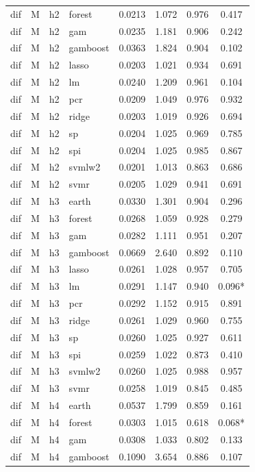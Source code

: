 \begin{ThreePartTable}
\begin{longtable}[t]{llclcccc}
dif & M & h2 & forest & 0.0213 & 1.072 & 0.976 & 0.417\\
dif & M & h2 & gam & 0.0235 & 1.181 & 0.906 & 0.242\\
dif & M & h2 & gamboost & 0.0363 & 1.824 & 0.904 & 0.102\\
dif & M & h2 & lasso & 0.0203 & 1.021 & 0.934 & 0.691\\
dif & M & h2 & lm & 0.0240 & 1.209 & 0.961 & 0.104\\
dif & M & h2 & pcr & 0.0209 & 1.049 & 0.976 & 0.932\\
dif & M & h2 & ridge & 0.0203 & 1.019 & 0.926 & 0.694\\
dif & M & h2 & sp & 0.0204 & 1.025 & 0.969 & 0.785\\
dif & M & h2 & spi & 0.0204 & 1.025 & 0.985 & 0.867\\
dif & M & h2 & svmlw2 & 0.0201 & 1.013 & 0.863 & 0.686\\
dif & M & h2 & svmr & 0.0205 & 1.029 & 0.941 & 0.691\\
\addlinespace
dif & M & h3 & earth & 0.0330 & 1.301 & 0.904 & 0.296\\
dif & M & h3 & forest & 0.0268 & 1.059 & 0.928 & 0.279\\
dif & M & h3 & gam & 0.0282 & 1.111 & 0.951 & 0.207\\
dif & M & h3 & gamboost & 0.0669 & 2.640 & 0.892 & 0.110\\
dif & M & h3 & lasso & 0.0261 & 1.028 & 0.957 & 0.705\\
dif & M & h3 & lm & 0.0291 & 1.147 & 0.940 & 0.096*\\
dif & M & h3 & pcr & 0.0292 & 1.152 & 0.915 & 0.891\\
dif & M & h3 & ridge & 0.0261 & 1.029 & 0.960 & 0.755\\
dif & M & h3 & sp & 0.0260 & 1.025 & 0.927 & 0.611\\
dif & M & h3 & spi & 0.0259 & 1.022 & 0.873 & 0.410\\
dif & M & h3 & svmlw2 & 0.0260 & 1.025 & 0.988 & 0.957\\
dif & M & h3 & svmr & 0.0258 & 1.019 & 0.845 & 0.485\\
\addlinespace
dif & M & h4 & earth & 0.0537 & 1.799 & 0.859 & 0.161\\
dif & M & h4 & forest & 0.0303 & 1.015 & 0.618 & 0.068*\\
dif & M & h4 & gam & 0.0308 & 1.033 & 0.802 & 0.133\\
dif & M & h4 & gamboost & 0.1090 & 3.654 & 0.886 & 0.107\\

\end{longtable}
\end{ThreePartTable}
